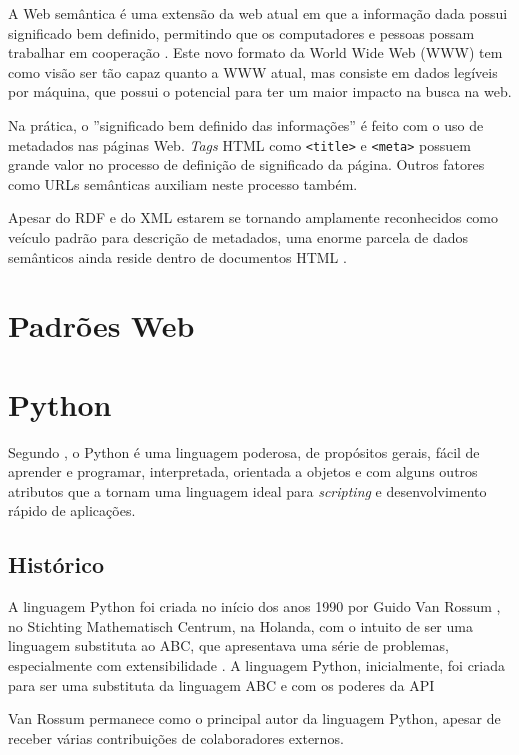 A Web semântica é uma extensão da web atual em que a informação dada possui significado bem definido, permitindo que os computadores e pessoas possam trabalhar em cooperação \cite[p. 13]{wober}. Este novo formato da World Wide Web (WWW) tem como visão ser tão capaz  quanto a WWW atual, mas consiste em dados legíveis por máquina, que possui o potencial para ter um maior impacto na busca na web.

Na prática, o ''significado bem definido das informações'' é feito com o uso de metadados nas páginas Web. \emph{Tags} HTML como \texttt{<title>} e \texttt{<meta>} possuem grande valor no processo de definição de significado da página. Outros fatores como URLs semânticas auxiliam neste processo também.

Apesar do RDF e do XML estarem se tornando amplamente reconhecidos como veículo padrão para descrição de metadados, uma enorme parcela de dados semânticos ainda reside dentro de documentos HTML \cite[p. 14]{wober}.

\pagebreak
\section{Padrões Web}

\pagebreak
\section{Python}

Segundo \cite{pythondoc}, o Python é uma linguagem poderosa, de propósitos gerais, fácil de aprender e programar, interpretada, orientada a objetos e com alguns outros atributos que a tornam uma linguagem ideal para \emph{scripting} e desenvolvimento rápido de aplicações.

\subsection{Histórico}

A linguagem Python foi criada no início dos anos 1990 por Guido Van Rossum \cite{pythonlicense}, no Stichting Mathematisch Centrum, na Holanda, com o intuito de ser uma linguagem substituta ao ABC, que apresentava uma série de problemas, especialmente com extensibilidade \cite{pythonfaq}. A linguagem Python, inicialmente, foi criada para ser uma substituta da linguagem ABC e com os poderes da API 

Van Rossum permanece como o principal autor da linguagem Python, apesar de receber várias contribuições de colaboradores externos.

